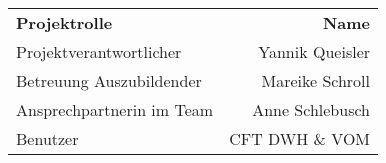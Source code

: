 \begin{tabular}{lr}
\rowcolor{KVGruen}\textbf{Projektrolle} & \textbf{Name} \\
Projektverantwortlicher & Yannik Queisler \\
\rowcolor{KVGrau}Betreuung Auszubildender & Mareike Schroll \\
Ansprechpartnerin im Team & Anne Schlebusch \\
\rowcolor{KVGrau}Benutzer & CFT DWH \& VOM \\
\end{tabular}
